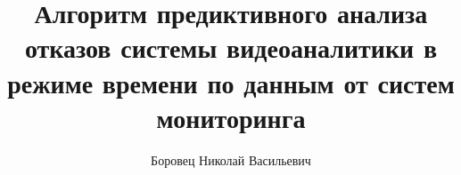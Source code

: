 \title{Алгоритм предиктивного анализа отказов системы видеоаналитики в режиме времени по данным от систем мониторинга}
\author{Боровец Николай Васильевич}

\makeatletter
\renewcommand{\maketitle}{
	\begin{titlepage}
		\renewcommand{\baselinestretch}{1}
		\begin{small}
			\begin{center}
				Федеральное государственное автономное образовательное учреждение\\
				высшего образования «Московский физико-технический институт\\
				(национальный исследовательский университет)»\\[.5\baselineskip]
				Физтех-школа аэрокосмических технологий\\[.5\baselineskip]
				Кафедра Аэрофизики и летательных аппаратов
			\end{center}
			
			~\
			
			\textbf{Направление подготовки:} 09.03.01 Информатика и вычислительная техника \\(бакалавриат)
			
			\textbf{Направленность (профиль) подготовки:} Компьютерное моделирование
			
			\textbf{Форма обучения:} очная
		\end{small}
		
		\vfill
		
		\begin{center}
			ВЫПУСКНАЯ КВАЛИФИКАЦИОННАЯ РАБОТА\\[.5\baselineskip]
			\textbf{«\@title»}\\[.5\baselineskip]
			(бакалаврская работа)
		\end{center}
		
		\vfill
		
		\begin{flushright}
			\begin{minipage}{.5\linewidth}
				\textbf{Студент:}\\
				\@author\\
				\(\underset{\emph{(подпись студента)}}{\uline{\hspace*{\linewidth-\baselineskip}}}\)
				
				~\
				

\end{minipage}
\end{flushright}
\end{titlepage}}
